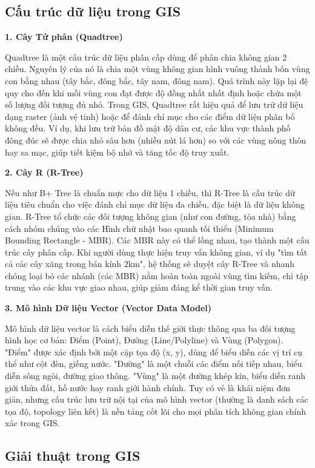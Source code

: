 \documentclass[a4paper,12pt]{article}
\begin{document}
\subsection{Cấu trúc dữ liệu trong GIS}

\textbf{1. Cây Tứ phân (Quadtree)}

Quadtree là một cấu trúc dữ liệu phân cấp dùng để phân chia không gian 2 chiều. Nguyên lý của nó là chia một vùng không gian hình vuông thành bốn vùng con bằng nhau (tây bắc, đông bắc, tây nam, đông nam). Quá trình này lặp lại đệ quy cho đến khi mỗi vùng con đạt được độ đồng nhất nhất định hoặc chứa một số lượng đối tượng đủ nhỏ. Trong GIS, Quadtree rất hiệu quả để lưu trữ dữ liệu dạng raster (ảnh vệ tinh) hoặc để đánh chỉ mục cho các điểm dữ liệu phân bố không đều. Ví dụ, khi lưu trữ bản đồ mật độ dân cư, các khu vực thành phố đông đúc sẽ được chia nhỏ sâu hơn (nhiều nút lá hơn) so với các vùng nông thôn hay sa mạc, giúp tiết kiệm bộ nhớ và tăng tốc độ truy xuất.

\textbf{2. Cây R (R-Tree)}

Nếu như B+ Tree là chuẩn mực cho dữ liệu 1 chiều, thì R-Tree là cấu trúc dữ liệu tiêu chuẩn cho việc đánh chỉ mục dữ liệu đa chiều, đặc biệt là dữ liệu không gian. R-Tree tổ chức các đối tượng không gian (như con đường, tòa nhà) bằng cách nhóm chúng vào các Hình chữ nhật bao quanh tối thiểu (Minimum Bounding Rectangle - MBR). Các MBR này có thể lồng nhau, tạo thành một cấu trúc cây phân cấp. Khi người dùng thực hiện truy vấn không gian, ví dụ "tìm tất cả các cây xăng trong bán kính 2km", hệ thống sẽ duyệt cây R-Tree và nhanh chóng loại bỏ các nhánh (các MBR) nằm hoàn toàn ngoài vùng tìm kiếm, chỉ tập trung vào các khu vực giao nhau, giúp giảm đáng kể thời gian truy vấn.

\textbf{3. Mô hình Dữ liệu Vector (Vector Data Model)}

Mô hình dữ liệu vector là cách biểu diễn thế giới thực thông qua ba đối tượng hình học cơ bản: Điểm (Point), Đường (Line/Polyline) và Vùng (Polygon). "Điểm" được xác định bởi một cặp tọa độ (x, y), dùng để biểu diễn các vị trí cụ thể như cột đèn, giếng nước. "Đường" là một chuỗi các điểm nối tiếp nhau, biểu diễn sông ngòi, đường giao thông. "Vùng" là một đường khép kín, biểu diễn ranh giới thửa đất, hồ nước hay ranh giới hành chính. Tuy có vẻ là khái niệm đơn giản, nhưng cấu trúc lưu trữ nội tại của mô hình vector (thường là danh sách các tọa độ, topology liên kết) là nền tảng cốt lõi cho mọi phân tích không gian chính xác trong GIS.

\subsection{Giải thuật trong GIS}
\end{document}

